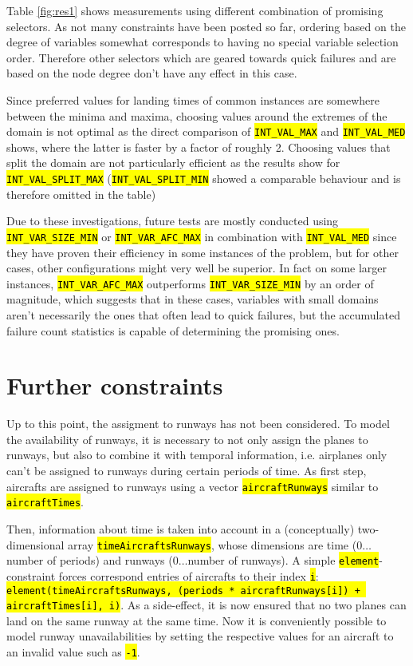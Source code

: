 \documentclass[,%
			paper=a4,%
			DIV12,
			liststotoc,
			bibtotoc,
			draft=false,%
			numbers=noendperiod
			]{scrartcl}
\newcommand{\ilc}[1]{\hl{\texttt{#1}}}
\newcommand{\mymarginnote}[1]{\marginnote{\footnotesize{#1}}}
\begin{document}
Table \ref{fig:res1} shows measurements using different combination of promising selectors.
As not many constraints have been posted so far, ordering based on the degree of variables somewhat corresponds to having no special variable selection order. Therefore other selectors which are geared towards quick failures and are based on the node degree don't have any effect in this case.

Since preferred values for landing times of common instances are somewhere between the minima and maxima, choosing values around the extremes of the domain is not optimal as the direct comparison of \ilc{INT\_VAL\_MAX} and \ilc{INT\_VAL\_MED} shows, where the latter is faster by a factor of roughly 2.
Choosing values that split the domain are not particularly efficient as the results show for \ilc{INT\_VAL\_SPLIT\_MAX} (\ilc{INT\_VAL\_SPLIT\_MIN} showed a comparable behaviour and is therefore omitted in the table)

Due to these investigations, future tests are mostly conducted using \ilc{INT\_VAR\_SIZE\_MIN} or \ilc{INT\_VAR\_AFC\_MAX} in combination with \ilc{INT\_VAL\_MED} since they have proven their efficiency in some instances of the problem, but for other cases, other configurations might very well be superior.
In fact on some larger instances, \ilc{INT\_VAR\_AFC\_MAX} outperforms \ilc{INT\_VAR\_SIZE\_MIN} by an order of magnitude, which suggests that in these cases, variables with small domains aren't necessarily the ones that often lead to quick failures, but the accumulated failure count statistics is capable of determining the promising ones.

\section{Further constraints}

\mymarginnote{\Crunway}
Up to this point, the assigment to runways has not been considered. 
To model the availability of runways, it is necessary to not only assign the planes to runways, but also to combine it with temporal information, i.e. airplanes only can't be assigned to runways during certain periods of time.
As first step, aircrafts are assigned to runways using a vector \ilc{aircraftRunways} similar to \ilc{aircraftTimes}. 

Then, information about time is taken into account in a (conceptually) two-dimensional array \ilc{timeAircraftsRunways}, whose dimensions are time ($0\dots$number of periods) and runways ($0\dots$number of runways). A simple \ilc{element}-constraint forces correspond entries of aircrafts to their index \ilc{i}: \ilc{element(timeAircraftsRunways, (periods * aircraftRunways[i]) + aircraftTimes[i], i)}.
As a side-effect, it is now ensured that no two planes can land on the same runway at the same time.
Now it is conveniently possible to model runway unavailabilities by setting the respective values for an aircraft to an invalid value such as \ilc{-1}.
\end{document}
